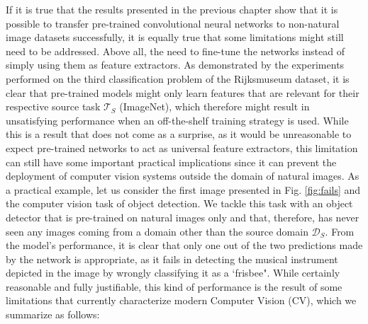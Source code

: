 If it is true that the results presented in the previous chapter show that it is possible to transfer pre-trained convolutional neural networks to non-natural image datasets successfully, it is equally true that some limitations might still need to be addressed. Above all, the need to fine-tune the networks instead of simply using them as feature extractors. As demonstrated by the experiments performed on the third classification problem of the Rijksmuseum dataset, it is clear that pre-trained models might only learn features that are relevant for their respective source task $\mathcal{T}_S$ (ImageNet), which therefore might result in unsatisfying performance when an off-the-shelf training strategy is used. While this is a result that does not come as a surprise, as it would be unreasonable to expect pre-trained networks to act as universal feature extractors, this limitation can still have some important practical implications since it can prevent the deployment of computer vision systems outside the domain of natural images. As a  practical example, let us consider the first image presented in Fig. \ref{fig:fails} and the computer vision task of object detection. We tackle this task with an object detector that is pre-trained on natural images only and that, therefore, has never seen any images coming from a domain other than the source domain $\mathcal{D}_S$. From the model's performance, it is clear that only one out of the two predictions made by the network is appropriate, as it fails in detecting the musical instrument depicted in the image by wrongly classifying it as a `frisbee". While certainly reasonable and fully justifiable, this kind of performance is the result of some limitations that currently characterize modern Computer Vision (CV), which we summarize as follows:

